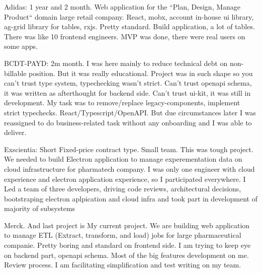 \documentclass[11pt, a4paper, sans]{article}
\begin{document}
Adidas: 1 year and 2 month. Web application for the “Plan, Design, Manage Product“ domain large retail company. React, mobx, account in-house ui library, ag-grid library for tables, rxjs. Pretty standard. Build application, a lot of tables. There was like 10 frontend engineers. MVP was done, there were real users on some apps.

BCDT-PAYD: 2m month. I was here mainly to reduce technical debt on non-billable position. But it was really educational. Project was in such shape so you can't trust type system, typechecking wasn't strict. Can't trust openapi schema, it was written as afterthought for backend side. Can't trust ui-kit, it was still in development.
My task was to remove/replace legacy-components, implement strict typechecks. React/Typescript/OpenAPI. But due circumstances later I was reassigned to do business-related task without any onboarding and I was able to deliver.

Exscientia: Short Fixed-price contract type. Small team. This was tough project. We needed to build Electron application to manage experementation data on cloud infrastructure for pharmatech company.
I was only one engineer with cloud experience and electron application experience, so I participated everywhere. I Led a team of three developers, driving code reviews, architectural decisions, bootstraping electron aplpication and cloud infra and took part in development of majority of subsystems

Merck. And last project is My current project. We are building web application to manage ETL (Extract, transform, and load) jobs for large pharmaceutical companie. Pretty boring and standard on frontend side. I am trying to keep eye on backend part, openapi schema. Most of the big features development on me. Review process. I am facilitating simplification and test writing on my team.
\end{document}
